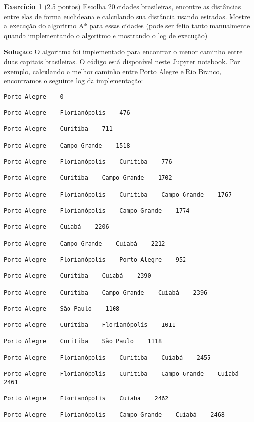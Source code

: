 \noindent \textbf{Exercício 1} (2.5 pontos) Escolha 20 cidades brasileiras, encontre as distâncias
entre elas de forma euclideana e calculando sua distância usando estradas.
Mostre a execução do algoritmo A* para essas cidades (pode ser feito
tanto manualmente quando implementando o algoritmo e mostrando o
log de execução).

\bigskip

\noindent \textbf{Solução:} O algoritmo foi implementado para encontrar o menor caminho entre duas capitais brasileiras. O código está disponível neste \href{https://github.com/lucasresck/data-structures-algorithms/blob/main/notebooks/city_distances.ipynb}{Jupyter notebook}. Por exemplo, calculando o melhor caminho entre Porto Alegre e Rio Branco, encontramos o seguinte log da implementação:

\begin{verbatim}
Porto Alegre    0

Porto Alegre    Florianópolis    476

Porto Alegre    Curitiba    711

Porto Alegre    Campo Grande    1518

Porto Alegre    Florianópolis    Curitiba    776

Porto Alegre    Curitiba    Campo Grande    1702

Porto Alegre    Florianópolis    Curitiba    Campo Grande    1767

Porto Alegre    Florianópolis    Campo Grande    1774

Porto Alegre    Cuiabá    2206

Porto Alegre    Campo Grande    Cuiabá    2212

Porto Alegre    Florianópolis    Porto Alegre    952

Porto Alegre    Curitiba    Cuiabá    2390

Porto Alegre    Curitiba    Campo Grande    Cuiabá    2396

Porto Alegre    São Paulo    1108

Porto Alegre    Curitiba    Florianópolis    1011

Porto Alegre    Curitiba    São Paulo    1118

Porto Alegre    Florianópolis    Curitiba    Cuiabá    2455

Porto Alegre    Florianópolis    Curitiba    Campo Grande    Cuiabá    2461

Porto Alegre    Florianópolis    Cuiabá    2462

Porto Alegre    Florianópolis    Campo Grande    Cuiabá    2468


\end{verbatim}
